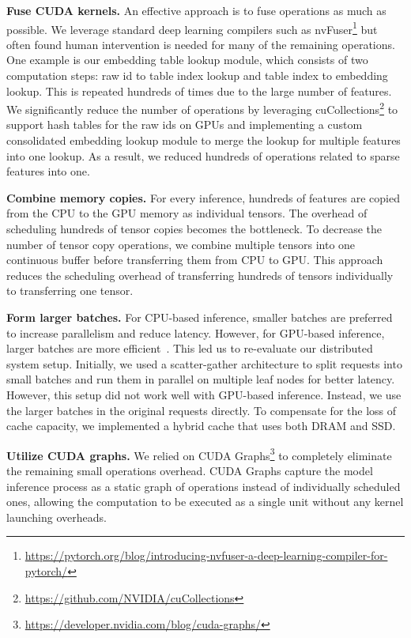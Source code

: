 \textbf{Fuse CUDA kernels.} An effective approach is to fuse operations as much as possible. We leverage standard deep learning compilers such as nvFuser\footnote{\url{https://pytorch.org/blog/introducing-nvfuser-a-deep-learning-compiler-for-pytorch/}} but often found human intervention is needed for many of the remaining operations. One example is our embedding table lookup module, which consists of two computation steps: raw id to table index lookup and table index to embedding lookup. This is repeated hundreds of times due to the large number of features. We significantly reduce the number of operations by leveraging cuCollections\footnote{\url{https://github.com/NVIDIA/cuCollections}} to support hash tables for the raw ids on GPUs and implementing a custom consolidated embedding lookup module to merge the lookup for multiple features into one lookup. As a result, we reduced hundreds of operations related to sparse features into one.

\textbf{Combine memory copies.} For every inference, hundreds of features are copied from the CPU to the GPU memory as individual tensors. The overhead of scheduling hundreds of tensor copies becomes the bottleneck. To decrease the number of tensor copy operations, we combine multiple tensors into one continuous buffer before transferring them from CPU to GPU. This approach reduces the scheduling overhead of transferring hundreds of tensors individually to transferring one tensor. 

\textbf{Form larger batches.} For CPU-based inference, smaller batches are preferred to increase parallelism and reduce latency. However, for GPU-based inference, larger batches are more efficient~\cite{sze2017efficient}. This led us to re-evaluate our distributed system setup. Initially, we used a scatter-gather architecture to split requests into small batches and run them in parallel on multiple leaf nodes for better latency. However, this setup did not work well with GPU-based inference. Instead, we use the larger batches in the original requests directly. To compensate for the loss of cache capacity, we implemented a hybrid cache that uses both DRAM and SSD.

\textbf{Utilize CUDA graphs.} We relied on CUDA Graphs\footnote{\url{https://developer.nvidia.com/blog/cuda-graphs/}} to completely eliminate the remaining small operations overhead. CUDA Graphs capture the model inference process as a static graph of operations instead of individually scheduled ones, allowing the computation to be executed as a single unit without any kernel launching overheads. 


